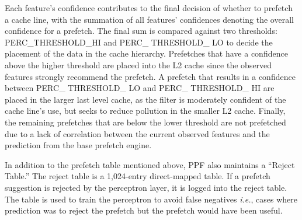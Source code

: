 Each feature's confidence contributes to the final decision of whether to
prefetch a cache line, with the summation of all features' confidences
denoting the overall confidence for a prefetch.  The final sum is compared
against two thresholds: PERC\_THRESHOLD\_HI and  PERC\_ THRESHOLD\_ LO to
decide the placement of the data in the cache hierarchy. Prefetches that have
a confidence above the higher threshold are placed into the L2 cache since the
observed features strongly recommend  the prefetch. A prefetch that results in
a confidence between PERC\_ THRESHOLD\_ LO and PERC\_ THRESHOLD\_ HI are
placed in the larger last level cache, as the filter is moderately confident
of the cache line's use, but seeks to reduce pollution in the smaller L2
cache. Finally, the remaining prefetches that are below the lower threshold
are not prefetched due to a lack of correlation between the current observed
features and the prediction from the base prefetch engine.

%
%
%

In addition to the prefetch table mentioned above, PPF also maintains a
``Reject Table.''  The reject table is a 1,024-entry direct-mapped table.
If a prefetch suggestion is rejected by the perceptron layer, it is logged
into the reject table.  The table is used to train the perceptron to avoid
false negatives \textit{i.e.}, cases where prediction was to reject the
prefetch but the prefetch would have been useful.

